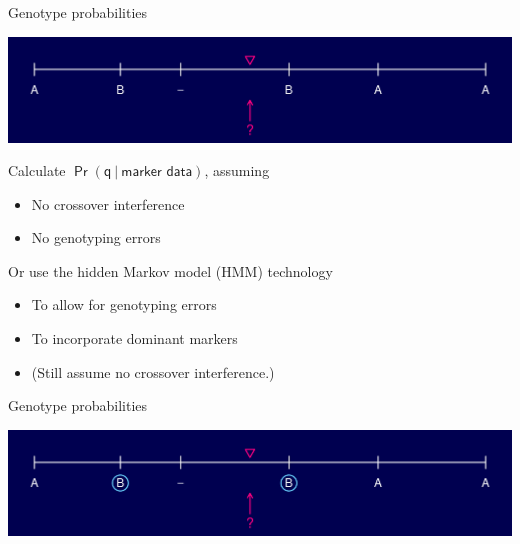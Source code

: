 \documentclass[12pt]{article}
\newcommand{\headsize}{\fontsize{35}{35} \selectfont}
\newcommand{\smallersize}{\fontsize{20}{25} \selectfont}
\begin{document}
\newpage

\addtocounter{page}{-1}

\headsize \color{myyellow}
\hfill \begin{minipage}{5.75in}
\centering
Genotype probabilities
\end{minipage}

\vspace{15mm}

\centerline{\includegraphics{FigsA/genoprob5.pdf}}

\vspace{15mm}

\hfill
\begin{minipage}{10in}
\color{mywhite} \smallersize
Calculate {\color{myblue} $\mathsf{\Pr(q \ | \ \text{marker data})}$}, assuming
\begin{itemize}
\item No crossover interference
\item No genotyping errors
\end{itemize}

\vspace{10mm}

Or use the {\color{mypink} hidden Markov model (HMM)} technology
\begin{itemize}
\item To allow for genotyping errors
\item To incorporate dominant markers
\item {\color{myblue} (Still assume no crossover interference.)}
\end{itemize}
\end{minipage}


\newpage

\addtocounter{page}{-1}

\headsize \color{myyellow}
\hfill \begin{minipage}{5.75in}
\centering
Genotype probabilities
\end{minipage}

\vspace{15mm}

\centerline{\includegraphics{FigsA/genoprob6.pdf}}
\end{document}
